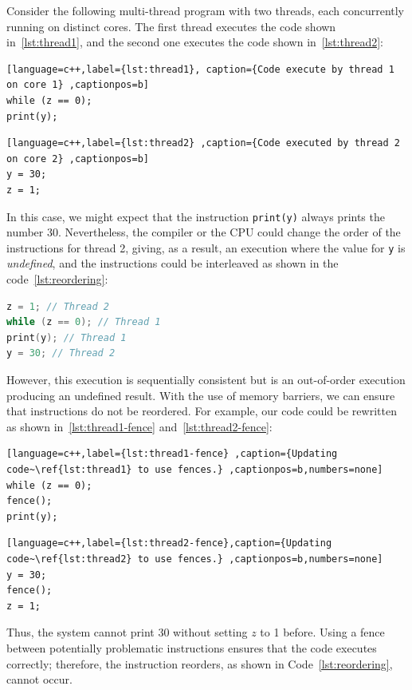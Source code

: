 \begin{example}
\label{ex:reordering}
Consider the following multi-thread program with two threads, each concurrently running on distinct cores. The first thread executes the code shown in~\ref{lst:thread1}, and the second one executes the code shown in~\ref{lst:thread2}:
\vspace{2mm}
\begin{lstlisting}[language=c++,label={lst:thread1}, caption={Code execute by thread 1 on core 1} ,captionpos=b]
while (z == 0);
print(y);
\end{lstlisting}

\begin{lstlisting}[language=c++,label={lst:thread2} ,caption={Code executed by thread 2 on core 2} ,captionpos=b]
y = 30;
z = 1;
\end{lstlisting}


In this case, we might expect that the instruction \texttt{print(y)} always prints the number 30. Nevertheless, the compiler or the CPU could change the order of the instructions for thread 2, giving, as a result, an execution where the value for \texttt{y} is \emph{undefined}, and the instructions could be interleaved as shown in the code~\ref{lst:reordering}:

\begin{lstlisting}[language=c++,label={lst:reordering},caption={Code reordered by CPU}, captionpos=b]
z = 1; // Thread 2
while (z == 0); // Thread 1
print(y); // Thread 1
y = 30; // Thread 2
\end{lstlisting}

However, this execution is sequentially consistent but is an out-of-order execution producing an undefined result. With the use of memory barriers, we can ensure that instructions do not be reordered. For example, our code could be rewritten as shown in~\ref{lst:thread1-fence} and~\ref{lst:thread2-fence}:

\begin{lstlisting}[language=c++,label={lst:thread1-fence} ,caption={Updating code~\ref{lst:thread1} to use fences.} ,captionpos=b,numbers=none]
while (z == 0);
fence();
print(y);
\end{lstlisting}

\begin{lstlisting}[language=c++,label={lst:thread2-fence},caption={Updating code~\ref{lst:thread2} to use fences.} ,captionpos=b,numbers=none]
y = 30;
fence();
z = 1;
\end{lstlisting}

Thus, the system cannot print 30 without setting \(z\) to 1 before. Using a fence between potentially problematic instructions ensures that the code executes correctly; therefore, the instruction reorders, as shown in Code~\ref{lst:reordering}, cannot occur.
\end{example}


